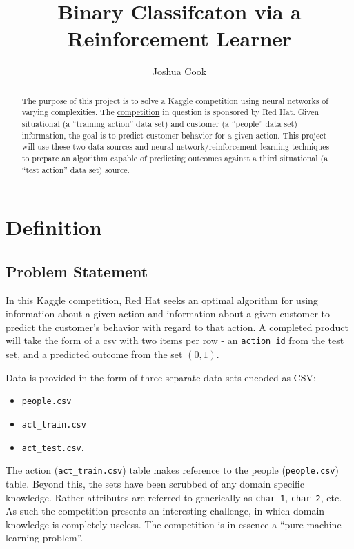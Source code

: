 \documentclass[]{report}
\title{Binary Classifcaton via a Reinforcement Learner}
\author{Joshua Cook}
\date{}
\begin{document}
\maketitle

\begin{abstract}
{The purpose of this project is to solve a Kaggle competition using
neural networks of varying complexities. The
\href{https://www.kaggle.com/c/predicting-red-hat-business-value}{competition}
in question is sponsored by Red Hat. Given situational (a ``training
action'' data set) and customer (a ``people'' data set) information, the
goal is to predict customer behavior for a given action. This project
will use these two data sources and neural network/reinforcement
learning techniques to prepare an algorithm capable of predicting
outcomes against a third situational (a ``test action'' data set)
source.}
\end{abstract}


\section{Definition}\label{definition}

\subsection{Problem Statement}\label{problem-statement}

In this Kaggle competition, Red Hat seeks an optimal algorithm for using
information about a given action and information about a given customer
to predict the customer's behavior with regard to that action. A
completed product will take the form of a csv with two items per row -
an \texttt{action\_id} from the test set, and a predicted outcome from
the set $(0,1)$.

Data is provided in the form of three separate data sets encoded as CSV:

\begin{itemize}
\itemsep1pt\parskip0pt
\item
  \texttt{people.csv}
\item
  \texttt{act\_train.csv}
\item
  \texttt{act\_test.csv}.
\end{itemize}

The action (\texttt{act\_train.csv}) table makes reference to the people
(\texttt{people.csv}) table. Beyond this, the sets have been scrubbed of
any domain specific knowledge. Rather attributes are referred to
generically as \texttt{char\_1}, \texttt{char\_2}, etc. As such the
competition presents an interesting challenge, in which domain knowledge
is completely useless. The competition is in essence a ``pure machine
learning problem''.
\end{document}
